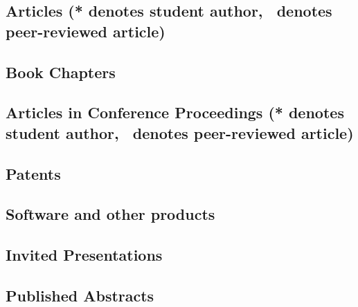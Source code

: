 \documentclass[10pt]{article}
\begin{document}
	\subsection[Articles]{Articles (* denotes student author, \textdagger\ denotes peer-reviewed article)}
    \begin{refsection}
        \nocite{*}
        \printbibliography[heading=none,type=article]
    \end{refsection}

	\subsection{Book Chapters}
    \begin{refsection}
        \nocite{*}
        \printbibliography[heading=none,type=incollection]
    \end{refsection}
	\subsection[Articles in Conference Proceedings]{Articles in Conference Proceedings (* denotes student author, \textdagger\ denotes peer-reviewed article)}
    \begin{refsection}
        \nocite{*}
        \printbibliography[heading=none,type=inproceedings]
    \end{refsection}
  \subsection{Patents}
    \begin{refsection}
        \nocite{*}
        \printbibliography[heading=none,type=patent]
       \end{refsection}
  \subsection{Software and other products}
  		
	\subsection{Invited Presentations}
	
	\subsection{Published Abstracts}
	
\end{document}

